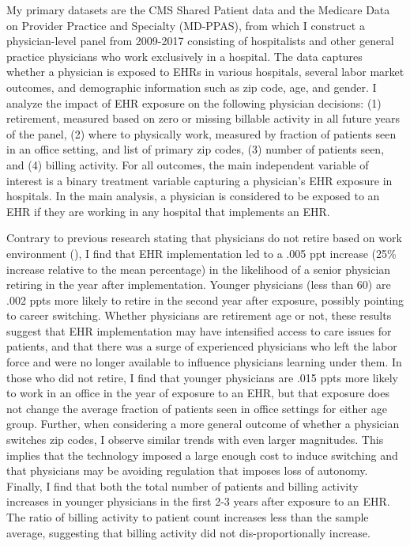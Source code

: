 \documentclass[11pt]{article}
\begin{document}
My primary datasets are the CMS Shared Patient data and the Medicare Data on Provider Practice and Specialty (MD-PPAS), from which I construct a physician-level panel from 2009-2017 consisting of hospitalists and other general practice physicians who work exclusively in a hospital. The data captures whether a physician is exposed to EHRs in various hospitals, several labor market outcomes, and demographic information such as zip code, age, and gender. I analyze the impact of EHR exposure on the following physician decisions: (1) retirement, measured based on zero or missing billable activity in all future years of the panel, (2) where to physically work, measured by fraction of patients seen in an office setting, and list of primary zip codes, (3) number of patients seen, and (4) billing activity. For all outcomes, the main independent variable of interest is a binary treatment variable capturing a physician's EHR exposure in hospitals. In the main analysis, a physician is considered to be exposed to an EHR if they are working in any hospital that implements an EHR.

Contrary to previous research stating that physicians do not retire based on work environment (\cite{Bahrami2002}), I find that EHR implementation led to a .005 ppt increase (25\% increase relative to the mean percentage) in the likelihood of a senior physician retiring in the year after implementation. Younger physicians (less than 60) are .002 ppts more likely to retire in the second year after exposure, possibly pointing to career switching. Whether physicians are retirement age or not, these results suggest that EHR implementation may have intensified access to care issues for patients, and that there was a surge of experienced physicians who left the labor force and were no longer available to influence physicians learning under them. In those who did not retire, I find that younger physicians are .015 ppts more likely to work in an office in the year of exposure to an EHR, but that exposure does not change the average fraction of patients seen in office settings for either age group. Further, when considering a more general outcome of whether a physician switches zip codes, I observe similar trends with even larger magnitudes. This implies that the technology imposed a large enough cost to induce switching and that physicians may be avoiding regulation that imposes loss of autonomy. Finally, I find that both the total number of patients and billing activity increases in younger physicians in the first 2-3 years after exposure to an EHR. The ratio of billing activity to patient count increases less than the sample average, suggesting that billing activity did not dis-proportionally increase. 
\end{document}
